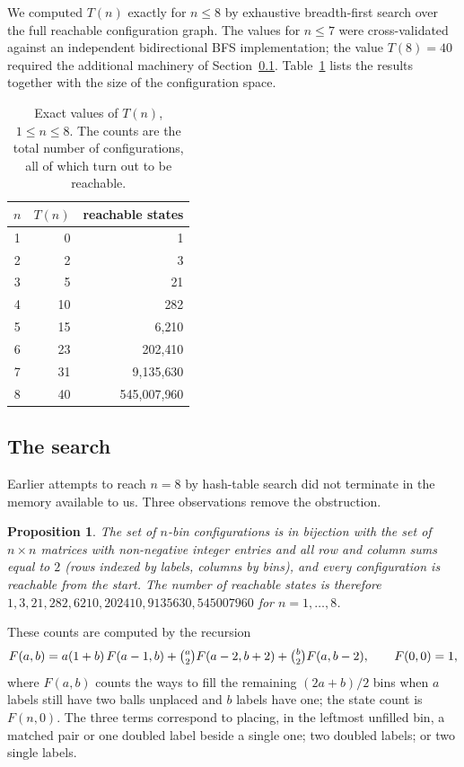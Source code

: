 \documentclass[11pt]{amsart}
\theoremstyle{plain}
\newtheorem{proposition}[theorem]{Proposition}
\theoremstyle{definition}
\theoremstyle{remark}
\begin{document}
We computed $T(n)$ exactly for $n\le 8$ by exhaustive breadth-first search over the full reachable configuration graph. The values for $n\le 7$ were cross-validated against an independent bidirectional BFS implementation; the value $T(8)=40$ required the additional machinery of Section~\ref{sec:search}. Table~\ref{tab:exact} lists the results together with the size of the configuration space.

\begin{table}[h]
\centering
\begin{tabular}{@{}crr@{}}
\toprule
$n$ & $T(n)$ & reachable states \\
\midrule
1 & 0 & 1 \\
2 & 2 & 3 \\
3 & 5 & 21 \\
4 & 10 & 282 \\
5 & 15 & 6{,}210 \\
6 & 23 & 202{,}410 \\
7 & 31 & 9{,}135{,}630 \\
8 & 40 & 545{,}007{,}960 \\
\bottomrule
\end{tabular}
\caption{Exact values of $T(n)$, $1\le n\le 8$. The counts are the total number of configurations, all of which turn out to be reachable.}
\label{tab:exact}
\end{table}

\subsection{The search}
\label{sec:search}

Earlier attempts to reach $n=8$ by hash-table search did not terminate in the memory available to us. Three observations remove the obstruction.

\begin{proposition}
\label{prop:statecount}
The set of $n$-bin configurations is in bijection with the set of $n\times n$ matrices with non-negative integer entries and all row and column sums equal to $2$ (rows indexed by labels, columns by bins), and every configuration is reachable from the start. The number of reachable states is therefore $1,3,21,282,6210,202410,9135630,545007960$ for $n=1,\dots,8$.
\end{proposition}

These counts are computed by the recursion
\[
F(a,b) = a(1+b)\,F(a-1,b) + \tbinom{a}{2} F(a-2,b+2) + \tbinom{b}{2} F(a,b-2),\qquad F(0,0)=1,
\]
where $F(a,b)$ counts the ways to fill the remaining $(2a+b)/2$ bins when $a$ labels still have two balls unplaced and $b$ labels have one; the state count is $F(n,0)$. The three terms correspond to placing, in the leftmost unfilled bin, a matched pair or one doubled label beside a single one; two doubled labels; or two single labels.
\end{document}
